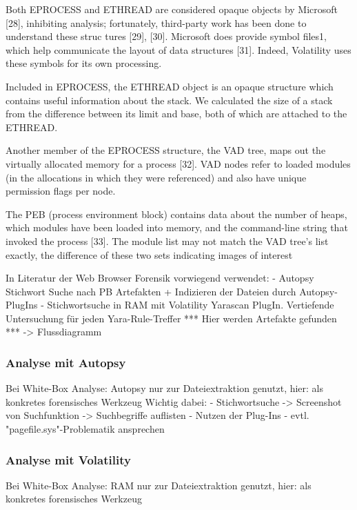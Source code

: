 	Both EPROCESS and ETHREAD are considered opaque objects by Microsoft [28], inhibiting analysis; fortunately, third-party work has been done to understand these struc tures [29], [30]. Microsoft does provide symbol files1, which help communicate the layout of data structures [31]. Indeed, Volatility uses these symbols for its own processing.
	
	Included in EPROCESS, the ETHREAD object is an opaque structure which contains useful information about the stack. We calculated the size of a stack from the difference between its limit and base, both of which are attached to the ETHREAD.
	
	Another member of the EPROCESS structure, the VAD tree, maps out the virtually allocated memory for a process [32]. VAD nodes refer to loaded modules (in the allocations in which they were referenced) and also have unique permission flags per node.
	
	The PEB (process environment block) contains data about the number of heaps, which modules have been loaded into memory, and the command-line string that invoked the process [33]. The module list may not match the VAD tree’s list
	exactly, the difference of these two sets indicating images of interest


In Literatur der Web Browser Forensik vorwiegend verwendet: 
- Autopsy Stichwort Suche nach PB Artefakten + Indizieren der Dateien durch Autopsy-PlugIns
- Stichwortsuche in RAM mit Volatility Yarascan PlugIn. Vertiefende Untersuchung für jeden Yara-Rule-Treffer *** Hier werden Artefakte gefunden *** -> Flussdiagramm

\subsubsection*{Analyse mit Autopsy}
Bei White-Box Analyse: Autopsy nur zur Dateiextraktion genutzt, hier: als konkretes forensisches Werkzeug
Wichtig dabei:
- Stichwortsuche 
	-> Screenshot von Suchfunktion
	-> Suchbegriffe auflisten 
- Nutzen der Plug-Ins
- evtl. "pagefile.sys"-Problematik ansprechen


\subsubsection*{Analyse mit Volatility}
Bei White-Box Analyse: RAM nur zur Dateiextraktion genutzt, hier: als konkretes forensisches Werkzeug

